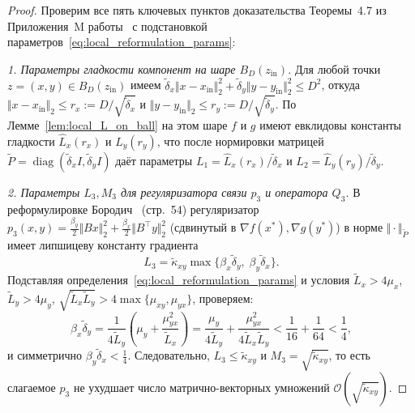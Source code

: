 \documentclass[11pt, a4paper]{article}
\theoremstyle{definition}
\begin{document}
\begin{proof}
Проверим все пять ключевых пунктов доказательства Теоремы~4.7 из Приложения~M работы~\cite{Borodich2025} с подстановкой параметров~\eqref{eq:local_reformulation_params}:

\emph{1. Параметры гладкости компонент на шаре $B_D(z_{\mathrm{in}})$.} Для любой точки $z = (x, y) \in B_D(z_{\mathrm{in}})$ имеем $\widetilde{\delta}_x \Vert x - x_{\mathrm{in}} \Vert_2^2 + \widetilde{\delta}_y \Vert y - y_{\mathrm{in}} \Vert_2^2 \le D^2$, откуда $\Vert x - x_{\mathrm{in}} \Vert_2 \le r_x := D/\sqrt{\widetilde{\delta}_x}$ и $\Vert y - y_{\mathrm{in}} \Vert_2 \le r_y := D/\sqrt{\widetilde{\delta}_y}$. По Лемме~\ref{lem:local_L_on_ball} на этом шаре $f$ и $g$ имеют евклидовы константы гладкости $\widehat{L}_x(r_x)$ и $\widehat{L}_y(r_y)$, что после нормировки матрицей $\widetilde{P} = \operatorname{diag}(\widetilde{\delta}_x I, \widetilde{\delta}_y I)$ даёт параметры $L_1 = \widehat{L}_x(r_x)/\widetilde{\delta}_x$ и $L_2 = \widehat{L}_y(r_y)/\widetilde{\delta}_y$.

\emph{2. Параметры $L_3, M_3$ для регуляризатора связи $p_3$ и оператора $Q_3$.} В реформулировке Бородич~\cite{Borodich2025} (стр.~54) регуляризатор $p_3(x, y) = \frac{\beta_y}{2}\Vert B x \Vert_2^2 + \frac{\beta_x}{2}\Vert B^\top y \Vert_2^2$ (сдвинутый в $\nabla f(x^*), \nabla g(y^*)$) в норме $\Vert \cdot \Vert_{\widetilde{P}}$ имеет липшицеву константу градиента
\[
L_3 = \widetilde{\kappa}_{xy} \max\{\beta_x \widetilde{\delta}_y,\; \beta_y \widetilde{\delta}_x\}.
\]
Подставляя определения~\eqref{eq:local_reformulation_params} и условия $\widetilde{L}_x > 4\mu_x$, $\widetilde{L}_y > 4\mu_y$, $\sqrt{\widetilde{L}_x \widetilde{L}_y} > 4\max\{\mu_{xy}, \mu_{yx}\}$, проверяем:
\[
\beta_x \widetilde{\delta}_y = \frac{1}{4\widetilde{L}_y}\left(\mu_y + \frac{\mu_{yx}^2}{\widetilde{L}_x}\right) = \frac{\mu_y}{4\widetilde{L}_y} + \frac{\mu_{yx}^2}{4\widetilde{L}_x \widetilde{L}_y} < \frac{1}{16} + \frac{1}{64} < \frac{1}{4},
\]
и симметрично $\beta_y \widetilde{\delta}_x < \frac{1}{4}$. Следовательно, $L_3 \le \widetilde{\kappa}_{xy}$ и $M_3 = \sqrt{\widetilde{\kappa}_{xy}}$, то есть слагаемое $p_3$ не ухудшает число матрично-векторных умножений $\mathcal{O}(\sqrt{\widetilde{\kappa}_{xy}})$.


\end{proof}
\end{document}
